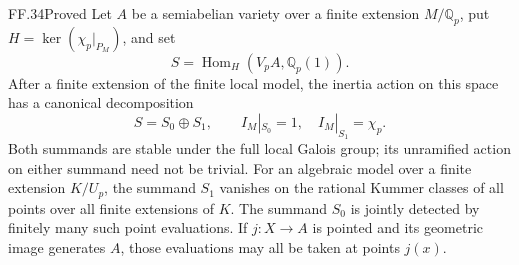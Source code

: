 \begin{claim}{FF.34}{Proved}\label{clm:FFcyclotomicsplitting}
Let \(A\) be a semiabelian variety over a finite extension
\(M/\mathbb Q_p\), put
\(H=\ker(\chi_p|_{P_M})\), and set
\[
 S=\operatorname{Hom}_H(V_pA,\mathbb Q_p(1)).
                                                        \tag{FF.34.1}
\]
After a finite extension of the finite local model, the
inertia action on this space has a canonical decomposition
\[
 S=S_0\oplus S_1,\qquad
 I_M|_{S_0}=1,\quad I_M|_{S_1}=\chi_p.
                                                        \tag{FF.34.2}
\]
Both summands are stable under the full local Galois group;
its unramified action on either summand need not be trivial.
For an algebraic model over a finite extension \(K/U_p\),
the summand \(S_1\) vanishes on the rational Kummer classes
of all points over all finite extensions of \(K\).
The summand \(S_0\) is jointly detected by finitely many
such point evaluations. If \(j:X\to A\) is pointed and
its geometric image generates \(A\), those evaluations
may all be taken at points \(j(x)\).
\end{claim}

